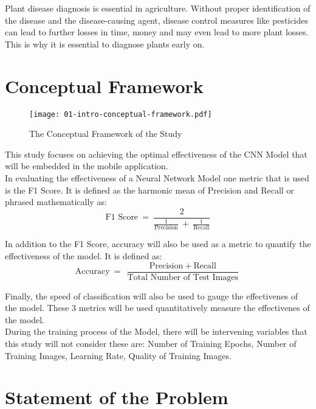 Plant disease diagnosis is essential in agriculture. Without proper 
identification of the disease and the disease-causing agent, disease 
control measures like pesticides can lead to further losses in time,
money and may even lead to more plant losses. This is why it is essential
to diagnose plants early on. \\ 

\section{Conceptual Framework}

\begin{figure}[H]
      \centering
      \texttt{[image: 01-intro-conceptual-framework.pdf]}
      \caption{The Conceptual Framework of the Study}
\end{figure}

This study focuses on achieving the optimal effectiveness of the CNN Model that 
will be embedded in the mobile application. \\ 

In evaluating the effectiveness of a Neural Network Model 
one metric that is used is the F1 Score. It is defined as the harmonic mean 
of Precision and Recall or phrased mathematically as:
\[ 
 \text{F1 Score} \: = \: \frac{2}{\frac{1}{\text{Precision}} \: + \: 
\frac{1}{\text{Recall}}} 
\]

In addition to the F1 Score, accuracy will also be used as a metric to 
quantify the effectiveness of the model. It is defined as:
\[
      \text{Accuracy} \: = \: \frac{\text{Precision} \: + \: 
      \text{Recall}}{\text{Total Number of Test Images}}
\]

Finally, the speed of classification will also be used to 
gauge the effectivenes of the model. These 3 metrics will be used 
quantitatively measure the effectivenes of the model. \\

During the training process of the Model, there will be intervening variables 
that this study will not consider these are: Number of Training Epochs, 
Number of Training Images, Learning Rate, Quality of Training Images.




\section{Statement of the Problem}

